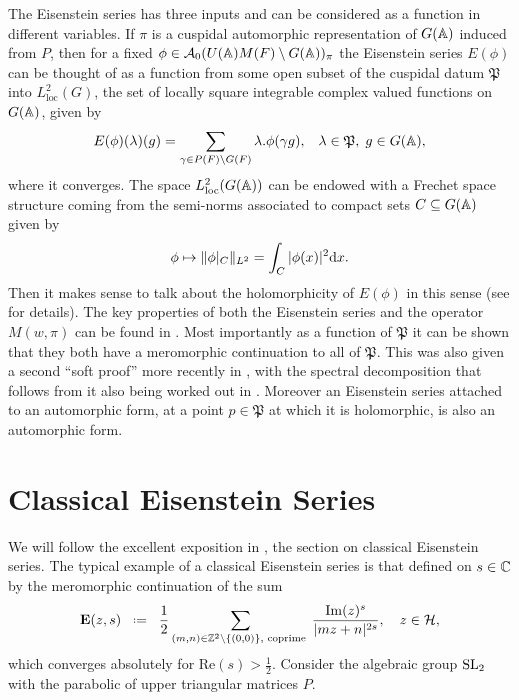 The Eisenstein series has three inputs and can be considered as a function in different variables. If \(\pi\) is a cuspidal automorphic representation of \(G(\A)\) induced from \(P\), then for a fixed \(\phi \in\mathcal{A}_0(U(\A)M(F)\setminus G(\A))_\pi \) the Eisenstein series \(E(\phi)\) can be thought of as a function from some open subset of the cuspidal datum \(\mathfrak{P}\) into \(L^2_{\mathrm{loc}}(G)\), the set of locally square integrable complex valued functions on \(G(\A)\), given by 
\[E(\phi)(\lambda)(g) = \sum_{\gamma \in P(F)\backslash G(F)} \lambda.\phi(\gamma g), \;\;\; \lambda\in \mathfrak{P},\; g\in G(\A),\]
where it converges. The space \(L^2_{\mathrm{loc}}(G(\A))\) can be endowed with a Frechet space structure coming from the semi-norms associated to compact sets \(C\subseteq G(\A)\) given by 
\[\phi \mapsto \norm{\phi|_C}_{L^2} = \int_C |\phi(x)|^2 \mathrm{d}x.\] 
Then it makes sense to talk about the holomorphicity of \(E(\phi)\) in this sense (see \cite[I.4.9]{moeglinSpectralDecompositionEisenstein1995} for details). The key properties of both the Eisenstein series and the operator \(M(w, \pi)\) can be found in \cite[IV.1.8, IV.1.9, IV.1.10, IV.1.11]{moeglinSpectralDecompositionEisenstein1995}. Most importantly as a function of \(\mathfrak{P}\) it can be shown that they both have a meromorphic continuation to all of \(\mathfrak{P}\). This was also given a second ``soft proof'' more recently in \cite{bernsteinMeromorphicContinuationEisenstein2023}, with the spectral decomposition that follows from it also being worked out in \cite{delormeSpectralTheoremLanglands2021}. Moreover an Eisenstein series attached to an automorphic form, at a point \(p\in \mathfrak{P}\) at which it is holomorphic, is also an automorphic form. 

\section{Classical Eisenstein Series}\label{sec:classic-eisenstein}

We will follow the excellent exposition in \cite{garrettTransitionEisensteinSeries2016}, the section \cite[1.2]{bruinier123ModularForms2008} on classical Eisenstein series. The typical example of a classical Eisenstein series is that defined on \(s\in \C\) by the meromorphic continuation of the sum
\[\mathbf{E}(z, s) \defeq \frac{1}{2} \sum_{(m,n)\in \Z^2\setminus \{(0,0)\}, \text{ coprime }} \frac{\mathrm{Im}(z)^{s}}{|mz+n|^{2s}}, \quad z\in \mathcal{H},\]
which converges absolutely for \(\mathrm{Re}(s)>\frac{1}{2}\). Consider the algebraic group \(\operatorname{SL}_2\) with the parabolic of upper triangular matrices \(P\).

